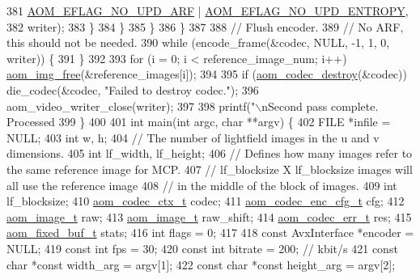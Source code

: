 \begin{DoxyCodeInclude}
{{{{{{{{{381                            \hyperlink{group__aom__encoder_ga469b4cf5ff76cb30de951e129c25a786}{AOM\_EFLAG\_NO\_UPD\_ARF} | 
      \hyperlink{group__aom__encoder_gac5a69f04b0bc88f755587a1da815d754}{AOM\_EFLAG\_NO\_UPD\_ENTROPY},
382                        writer);
383         \}
384       \}
385     \}
386   \}
387 
388   \textcolor{comment}{// Flush encoder.}
389   \textcolor{comment}{// No ARF, this should not be needed.}
390   \textcolor{keywordflow}{while} (encode\_frame(&codec, NULL, -1, 1, 0, writer)) \{
391   \}
392 
393   \textcolor{keywordflow}{for} (i = 0; i < reference\_image\_num; i++) \hyperlink{aom__image_8h_afff22f7f3eb9409c5b678d1962f110a8}{aom\_img\_free}(&reference\_images[i]);
394 
395   \textcolor{keywordflow}{if} (\hyperlink{group__codec_ga9b60e186f61ba2d6ab2b8069b76a15c5}{aom\_codec\_destroy}(&codec)) die\_codec(&codec, \textcolor{stringliteral}{"Failed to destroy codec."});
396   aom\_video\_writer\_close(writer);
397 
398   printf(\textcolor{stringliteral}{"\(\backslash\)nSecond pass complete. Processed %
399 \}
400 
401 \textcolor{keywordtype}{int} main(\textcolor{keywordtype}{int} argc, \textcolor{keywordtype}{char} **argv) \{
402   FILE *infile = NULL;
403   \textcolor{keywordtype}{int} w, h;
404   \textcolor{comment}{// The number of lightfield images in the u and v dimensions.}
405   \textcolor{keywordtype}{int} lf\_width, lf\_height;
406   \textcolor{comment}{// Defines how many images refer to the same reference image for MCP.}
407   \textcolor{comment}{// lf\_blocksize X lf\_blocksize images will all use the reference image}
408   \textcolor{comment}{// in the middle of the block of images.}
409   \textcolor{keywordtype}{int} lf\_blocksize;
410   \hyperlink{structaom__codec__ctx}{aom\_codec\_ctx\_t} codec;
411   \hyperlink{structaom__codec__enc__cfg}{aom\_codec\_enc\_cfg\_t} cfg;
412   \hyperlink{structaom__image}{aom\_image\_t} raw;
413   \hyperlink{structaom__image}{aom\_image\_t} raw\_shift;
414   \hyperlink{group__codec_gaaae61e0f8663e6137f1e228757248e7c}{aom\_codec\_err\_t} res;
415   \hyperlink{structaom__fixed__buf}{aom\_fixed\_buf\_t} stats;
416   \textcolor{keywordtype}{int} flags = 0;
417 
418   \textcolor{keyword}{const} AvxInterface *encoder = NULL;
419   \textcolor{keyword}{const} \textcolor{keywordtype}{int} fps = 30;
420   \textcolor{keyword}{const} \textcolor{keywordtype}{int} bitrate = 200;  \textcolor{comment}{// kbit/s}
421   \textcolor{keyword}{const} \textcolor{keywordtype}{char} *\textcolor{keyword}{const} width\_arg = argv[1];
422   \textcolor{keyword}{const} \textcolor{keywordtype}{char} *\textcolor{keyword}{const} height\_arg = argv[2];
}}}}}}}}}}
\end{DoxyCodeInclude}
